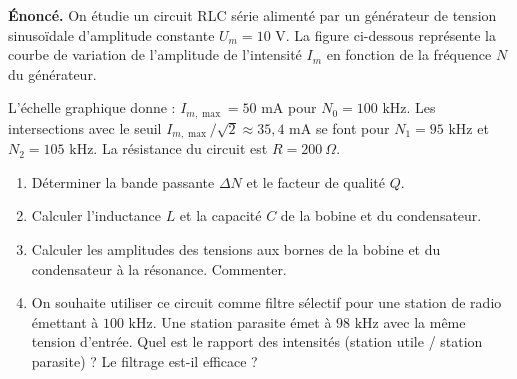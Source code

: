 \documentclass[11pt]{article}
\begin{document}
\begin{exoresolu}
\textbf{Énoncé.}
On étudie un circuit RLC série alimenté par un générateur de tension sinusoïdale d'amplitude constante $U_m = 10 \text{ V}$. La figure ci-dessous représente la courbe de variation de l'amplitude de l'intensité $I_m$ en fonction de la fréquence $N$ du générateur.
\begin{center}
\end{center}
L'échelle graphique donne : $I_{m,\max} = 50 \text{ mA}$ pour $N_0 = 100 \text{ kHz}$. Les intersections avec le seuil $I_{m,\max}/\sqrt{2} \approx 35,4 \text{ mA}$ se font pour $N_1 = 95 \text{ kHz}$ et $N_2 = 105 \text{ kHz}$.
La résistance du circuit est $R = 200 \ \Omega$.
\begin{enumerate}
    \item Déterminer la bande passante $\Delta N$ et le facteur de qualité $Q$.
    \item Calculer l'inductance $L$ et la capacité $C$ de la bobine et du condensateur.
    \item Calculer les amplitudes des tensions aux bornes de la bobine et du condensateur à la résonance. Commenter.
    \item On souhaite utiliser ce circuit comme filtre sélectif pour une station de radio émettant à $100 \text{ kHz}$. Une station parasite émet à $98 \text{ kHz}$ avec la même tension d'entrée. Quel est le rapport des intensités (station utile / station parasite) ? Le filtrage est-il efficace ?

\end{enumerate}
\end{exoresolu}
\end{document}
